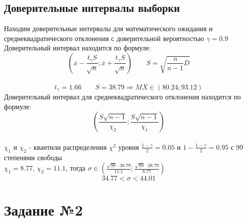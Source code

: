 \documentclass[12pt,a4paper]{report}
\begin{document}
\subsection*{Доверительные интервалы выборки}
Находим доверительные интервалы для математического ожидания и
среднеквадратического отклонения с доверительной вероятностью $\gamma=0.9$\\
\hfill\break
Доверительный интервал находится по формуле:
$$(\overline{x}-\frac{t_\gamma S}{\sqrt{n}}; \overline{x}+\frac{t_\gamma S}{\sqrt{n}})\qquad S=\sqrt{\frac{n}{n-1}D}$$ \\
$$t_\gamma=1.66\qquad S=38.79\Rightarrow MX\in(80.24; 93.12)$$
Доверительный интервал для среднеквадратического отклонения находится по формуле:
$$(\frac{S\sqrt{n-1}}{\chi_2}; \frac{S\sqrt{n-1}}{\chi_1})$$\\
\hfill\break
$\chi_1$ и $\chi_2$ - квантили распределения $\chi^2$ уровня $\frac{1-\gamma}{2}=0.05$ и $1-\frac{1-\gamma}{2}=0.95$ с 99 степенями свободы\\
\hfill\break
$\chi_1=8.77$, $\chi_2=11.1$, тогда $\sigma \in (\frac{\sqrt{99}\cdot38.79}{11.1}; \frac{\sqrt{99}\cdot38.79}{8.77})$
$$34.77 < \sigma < 44.01$$
\section*{Задание №2}
\end{document}
